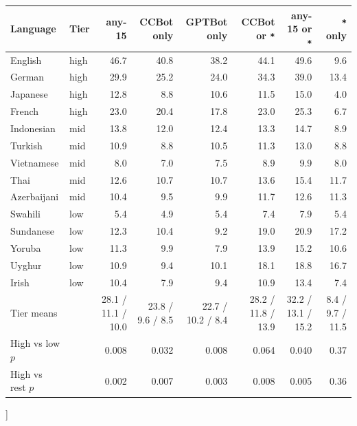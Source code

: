 \documentclass[11pt]{article}
\begin{document}
\vspace{10pt}
\begin{minipage}{\textwidth}
\centering
\scriptsize
\setlength{\tabcolsep}{4pt}
\begin{tabular}{llrrrrrr}
\toprule
Language & Tier & any-15 & CCBot only & GPTBot only & CCBot or \texttt{*} & any-15 or \texttt{*} & \texttt{*} only \\
\midrule
English & high & 46.7 & 40.8 & 38.2 & 44.1 & 49.6 & 9.6 \\
German & high & 29.9 & 25.2 & 24.0 & 34.3 & 39.0 & 13.4 \\
Japanese & high & 12.8 & 8.8 & 10.6 & 11.5 & 15.0 & 4.0 \\
French & high & 23.0 & 20.4 & 17.8 & 23.0 & 25.3 & 6.7 \\
Indonesian & mid & 13.8 & 12.0 & 12.4 & 13.3 & 14.7 & 8.9 \\
Turkish & mid & 10.9 & 8.8 & 10.5 & 11.3 & 13.0 & 8.8 \\
Vietnamese & mid & 8.0 & 7.0 & 7.5 & 8.9 & 9.9 & 8.0 \\
Thai & mid & 12.6 & 10.7 & 10.7 & 13.6 & 15.4 & 11.7 \\
Azerbaijani & mid & 10.4 & 9.5 & 9.9 & 11.7 & 12.6 & 11.3 \\
Swahili & low & 5.4 & 4.9 & 5.4 & 7.4 & 7.9 & 5.4 \\
Sundanese & low & 12.3 & 10.4 & 9.2 & 19.0 & 20.9 & 17.2 \\
Yoruba & low & 11.3 & 9.9 & 7.9 & 13.9 & 15.2 & 10.6 \\
Uyghur & low & 10.9 & 9.4 & 10.1 & 18.1 & 18.8 & 16.7 \\
Irish & low & 10.4 & 7.9 & 9.4 & 10.9 & 13.4 & 7.4 \\
\midrule
Tier means & & 28.1 / 11.1 / 10.0 & 23.8 / 9.6 / 8.5 & 22.7 / 10.2 / 8.4 & 28.2 / 11.8 / 13.9 & 32.2 / 13.1 / 15.2 & 8.4 / 9.7 / 11.5 \\
High vs low $p$ & & 0.008 & 0.032 & 0.008 & 0.064 & 0.040 & 0.37 \\
High vs rest $p$ & & 0.002 & 0.007 & 0.003 & 0.008 & 0.005 & 0.36 \\
\bottomrule
\end{tabular}
\label{tab:app-policy}
\end{minipage}
]
\end{document}
